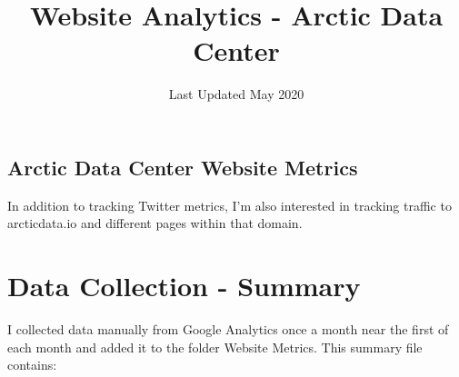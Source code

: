 \documentclass[]{article}
\title{Website Analytics - Arctic Data Center}
\author{}
\date{\vspace{-2.5em}Last Updated May 2020}
\begin{document}
\maketitle

\hypertarget{arctic-data-center-website-metrics}{%
\subsection{Arctic Data Center Website
Metrics}\label{arctic-data-center-website-metrics}}

In addition to tracking Twitter metrics, I'm also interested in tracking
traffic to arcticdata.io and different pages within that domain.

\hypertarget{data-collection---summary}{%
\section{Data Collection - Summary}\label{data-collection---summary}}

I collected data manually from Google Analytics once a month near the
first of each month and added it to the folder Website Metrics. This
summary file contains:
\end{document}
